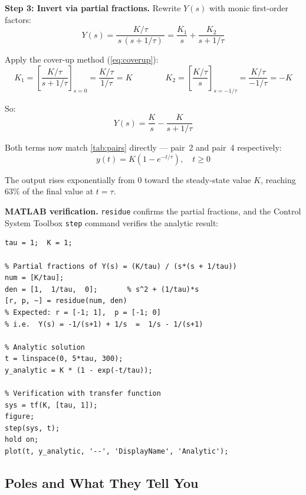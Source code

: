 \documentclass[../../book.tex]{subfiles}
\begin{document}
\textbf{Step 3: Invert via partial fractions.}  Rewrite $Y(s)$ with monic
first-order factors:
\[
  Y(s) = \frac{K/\tau}{\,s\,(s + 1/\tau)\,} = \frac{K_1}{s} + \frac{K_2}{s + 1/\tau}
\]

Apply the cover-up method (\cref{eq:coverup}):
\[
  K_1 = \left[\frac{K/\tau}{s + 1/\tau}\right]_{s=0}
      = \frac{K/\tau}{1/\tau} = K
  \qquad\qquad
  K_2 = \left[\frac{K/\tau}{s}\right]_{s=-1/\tau}
      = \frac{K/\tau}{-1/\tau} = -K
\]

So:
\begin{equation}
  Y(s) = \frac{K}{s} - \frac{K}{s + 1/\tau}
  \label{eq:fo_pf}
\end{equation}

Both terms now match \cref{tab:pairs} directly --- pair~2 and pair~4
respectively:
\begin{equation}
  \boxed{y(t) = K\!\left(1 - e^{-t/\tau}\right), \quad t \geq 0}
  \label{eq:fo_response}
\end{equation}

The output rises exponentially from 0 toward the steady-state value $K$,
reaching $63\%$ of the final value at $t = \tau$.


\textbf{MATLAB verification.}  \texttt{residue} confirms the partial fractions,
and the Control System Toolbox \texttt{step} command verifies the analytic
result:
\begin{Verbatim}[frame=single, fontsize=\small]
tau = 1;  K = 1;

% Partial fractions of Y(s) = (K/tau) / (s*(s + 1/tau))
num = [K/tau];
den = [1,  1/tau,  0];       % s^2 + (1/tau)*s
[r, p, ~] = residue(num, den)
% Expected: r = [-1; 1],  p = [-1; 0]
% i.e.  Y(s) = -1/(s+1) + 1/s  =  1/s - 1/(s+1)

% Analytic solution
t = linspace(0, 5*tau, 300);
y_analytic = K * (1 - exp(-t/tau));

% Verification with transfer function
sys = tf(K, [tau, 1]);
figure;
step(sys, t);
hold on;
plot(t, y_analytic, '--', 'DisplayName', 'Analytic');
\end{Verbatim}

\subsection{Poles and What They Tell You}
\label{sec:poles}
\end{document}
